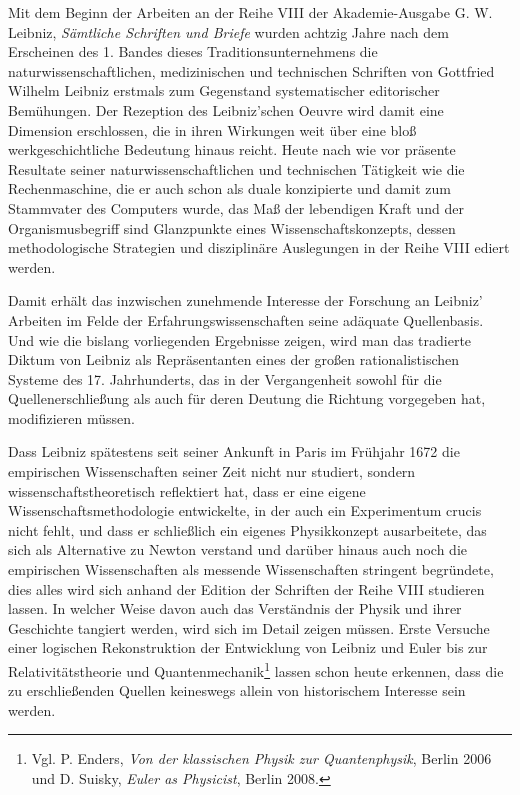 \thispagestyle{empty}
{\vrule height 0mm depth 30mm width 0mm}
\par
Mit dem Beginn der Arbeiten an der Reihe VIII der Akademie-Ausgabe G. W. Leibniz, \textit{S\"{a}mtliche Schriften und Briefe} wurden achtzig Jahre nach dem Erscheinen des 1. Bandes dieses Traditionsunternehmens die naturwissenschaft\-lichen, medizinischen und technischen Schriften von Gottfried Wilhelm Leibniz erstmals zum Gegenstand systematischer editorischer Bem\"{u}hungen. Der Rezeption des Leibniz'schen Oeuvre wird damit eine Dimension erschlossen, die in ihren Wirkungen weit \"{u}ber eine bloß werkgeschichtliche Bedeutung hinaus reicht. Heute nach wie vor pr\"{a}sente Resultate seiner naturwissenschaftlichen und technischen T\"{a}tigkeit wie die Rechenmaschine, die er auch schon als duale konzipierte und damit zum Stammvater des Computers wurde, das Maß der lebendigen Kraft und der Organismusbegriff sind Glanzpunkte eines Wissenschaftskonzepts, dessen methodologische Strategien und disziplin\"{a}re Auslegungen in der Reihe VIII ediert werden.\par
Damit erh\"{a}lt das inzwischen zunehmende Interesse der Forschung an Leibniz’ Arbeiten im Felde der Erfahrungswissenschaften seine ad\"{a}quate Quellenbasis. Und wie die bislang vorliegenden Ergebnisse zeigen, wird man das tradierte Dik\-tum von Leibniz als Repr\"{a}sentanten eines der großen rationalistischen Systeme des 17. Jahrhunderts, das in der Vergangenheit sowohl f\"{u}r die Quellenerschließung als auch f\"{u}r deren Deutung die Richtung vorgegeben hat, modifizieren m\"{u}ssen.\par
Dass Leibniz sp\"{a}testens seit seiner Ankunft in Paris im Fr\"{u}hjahr 1672 die empirischen Wissenschaften seiner Zeit nicht nur studiert, sondern wissenschafts\-theoretisch reflektiert hat, dass er eine eigene Wissenschaftsmethodologie ent\-wickelte, in der auch ein Experimentum crucis nicht fehlt, und dass er schließlich ein eigenes Physikkonzept ausarbeitete, das sich als Alternative zu Newton verstand und dar\"{u}ber hinaus auch noch die empirischen Wissenschaften als messende Wissenschaften stringent begr\"{u}ndete, dies alles wird sich anhand der Edition der Schriften der Reihe VIII studieren lassen. In welcher Weise davon auch das Verst\"{a}ndnis der Physik und ihrer Geschichte tangiert werden, wird sich im Detail zeigen m\"{u}ssen. Erste Versuche einer logischen Rekonstruktion der Entwicklung von Leibniz und Euler bis zur Relativit\"{a}tstheorie und Quantenmechanik\footnote{\footnotesize Vgl. P. Enders, \textit{Von der klassischen Physik zur Quantenphysik}, Berlin 2006 und D. Suisky, \textit{Euler as Physicist}, Berlin 2008.} lassen schon heute erkennen, dass die zu erschließenden Quellen keineswegs allein von historischem Interesse sein werden.\par
